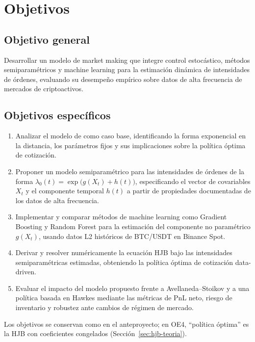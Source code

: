 \chapter{Objetivos}

\section{Objetivo general}

Desarrollar un modelo de market making que integre control estocástico, métodos
semiparamétricos y machine learning para la estimación dinámica de intensidades de
órdenes, evaluando su desempeño empírico sobre datos de alta frecuencia de mercados
de criptoactivos.

\section{Objetivos específicos}

\begin{enumerate}[label=\textbf{OE\arabic*.}]
  \item Analizar el modelo de \citet{AvellanedaStoikov2008} como caso base,
        identificando la forma exponencial en la distancia, los parámetros fijos y
        sus implicaciones sobre la política óptima de cotización.
  \item Proponer un modelo semiparamétrico para las intensidades de órdenes de la
        forma $\lambda_0(t) = \exp\bigl(g(X_t) + h(t)\bigr)$, especificando el vector
        de covariables $X_t$ y el componente temporal $h(t)$ a partir de propiedades
        documentadas de los datos de alta frecuencia.
  \item Implementar y comparar métodos de machine learning como Gradient Boosting
        y Random Forest para la estimación del componente no
        paramétrico $g(X_t)$, usando datos L2 históricos de BTC/USDT en Binance Spot.
  \item Derivar y resolver numéricamente la ecuación HJB bajo las intensidades
        semiparamétricas estimadas, obteniendo la política óptima de cotización
        data-driven.
  \item Evaluar el impacto del modelo propuesto frente a Avellaneda--Stoikov y a una
        política basada en Hawkes mediante las métricas de PnL neto, riesgo de
        inventario y robustez ante cambios de régimen de mercado.
\end{enumerate}

Los objetivos se conservan como en el anteproyecto; en OE4, ``política óptima'' es la HJB con coeficientes congelados (Sección~\ref{sec:hjb-teoria}).

